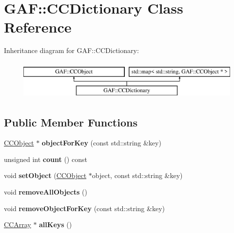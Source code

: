 \hypertarget{class_g_a_f_1_1_c_c_dictionary}{\section{G\-A\-F\-:\-:C\-C\-Dictionary Class Reference}
\label{class_g_a_f_1_1_c_c_dictionary}
}
Inheritance diagram for G\-A\-F\-:\-:C\-C\-Dictionary\-:\begin{figure}[H]
\begin{center}
\leavevmode
\includegraphics[height=2.000000cm]{class_g_a_f_1_1_c_c_dictionary}
\end{center}
\end{figure}
\subsection*{Public Member Functions}
\begin{DoxyCompactItemize}
\item 
\hypertarget{class_g_a_f_1_1_c_c_dictionary_a87a75f694d826abeb45451832714973e}{\hyperlink{class_g_a_f_1_1_c_c_object}{C\-C\-Object} $\ast$ {\bfseries object\-For\-Key} (const std\-::string \&key)}\label{class_g_a_f_1_1_c_c_dictionary_a87a75f694d826abeb45451832714973e}

\item 
\hypertarget{class_g_a_f_1_1_c_c_dictionary_a43d5b140a991edf12261fa4eaa849180}{unsigned int {\bfseries count} () const }\label{class_g_a_f_1_1_c_c_dictionary_a43d5b140a991edf12261fa4eaa849180}

\item 
\hypertarget{class_g_a_f_1_1_c_c_dictionary_a1830bfd69de9d6cfb0791e0c949e65bf}{void {\bfseries set\-Object} (\hyperlink{class_g_a_f_1_1_c_c_object}{C\-C\-Object} $\ast$object, const std\-::string \&key)}\label{class_g_a_f_1_1_c_c_dictionary_a1830bfd69de9d6cfb0791e0c949e65bf}

\item 
\hypertarget{class_g_a_f_1_1_c_c_dictionary_a469d957a35b3cd4441809e220e2463f8}{void {\bfseries remove\-All\-Objects} ()}\label{class_g_a_f_1_1_c_c_dictionary_a469d957a35b3cd4441809e220e2463f8}

\item 
\hypertarget{class_g_a_f_1_1_c_c_dictionary_a10310a3d3a87647dbfc2b33348b0a33e}{void {\bfseries remove\-Object\-For\-Key} (const std\-::string \&key)}\label{class_g_a_f_1_1_c_c_dictionary_a10310a3d3a87647dbfc2b33348b0a33e}

\item 
\hypertarget{class_g_a_f_1_1_c_c_dictionary_a2acc9819bce13b2ac2c93ff9eab800aa}{\hyperlink{class_g_a_f_1_1_c_c_array}{C\-C\-Array} $\ast$ {\bfseries all\-Keys} ()}\label{class_g_a_f_1_1_c_c_dictionary_a2acc9819bce13b2ac2c93ff9eab800aa}

\end{DoxyCompactItemize}
